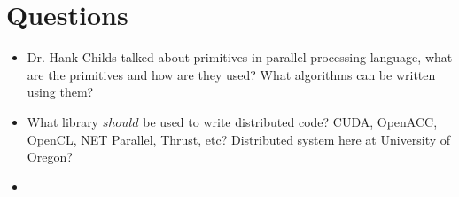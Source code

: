 \documentclass[12pt]{article}
\begin{document}
\section{Questions}
\begin{itemize}
\item Dr. Hank Childs talked about primitives in parallel processing language, what are the primitives and how are they used? What algorithms can be written using them?
\item What library $should$ be used to write distributed code? CUDA, OpenACC, OpenCL, NET Parallel, Thrust, etc? Distributed system here at University of Oregon? 
\item 
\end{itemize}


\end{document}

